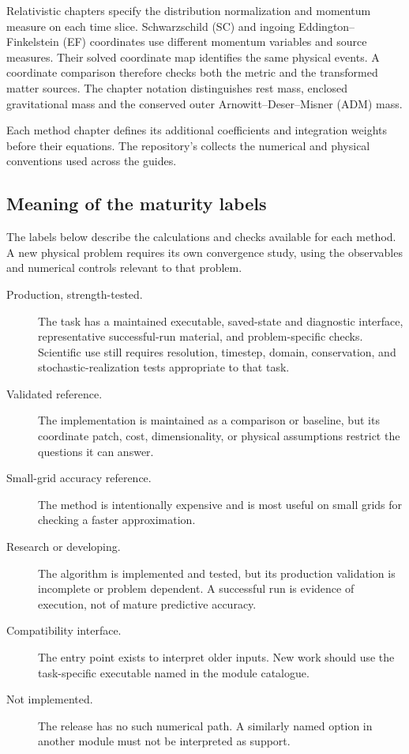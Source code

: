 Relativistic chapters specify the distribution normalization and momentum
measure on each time slice. Schwarzschild (SC) and ingoing
Eddington--Finkelstein (EF) coordinates use different momentum variables
and source measures. Their solved coordinate map identifies the same
physical events. A coordinate comparison therefore checks both the metric
and the transformed matter sources. The chapter notation distinguishes
rest mass, enclosed gravitational mass and the conserved outer
Arnowitt--Deser--Misner (ADM) mass.

Each method chapter defines its additional coefficients and integration
weights before their equations. The repository's 
collects the numerical and physical conventions used across the guides.

\subsection{Meaning of the maturity labels}

The labels below describe the calculations and checks available for each
method. A new physical problem requires its own convergence study, using the
observables and numerical controls relevant to that problem.

\begin{description}
\item[Production, strength-tested.] The task has a maintained executable,
      saved-state and diagnostic interface, representative successful-run
      material, and problem-specific checks.  Scientific use still requires
      resolution, timestep, domain, conservation, and stochastic-realization
      tests appropriate to that task.
\item[Validated reference.] The implementation is maintained as a comparison
      or baseline, but its coordinate patch, cost, dimensionality, or physical
      assumptions restrict the questions it can answer.
\item[Small-grid accuracy reference.] The method is intentionally expensive and is
      most useful on small grids for checking a faster approximation.
\item[Research or developing.] The algorithm is implemented and tested, but
      its production validation is incomplete or problem dependent.  A
      successful run is evidence of execution, not of mature predictive
      accuracy.
\item[Compatibility interface.] The entry point exists to interpret older
      inputs.  New work should use the task-specific executable named in the
      module catalogue.
\item[Not implemented.] The release has no such numerical path.  A similarly
      named option in another module must not be interpreted as support.
\end{description}

